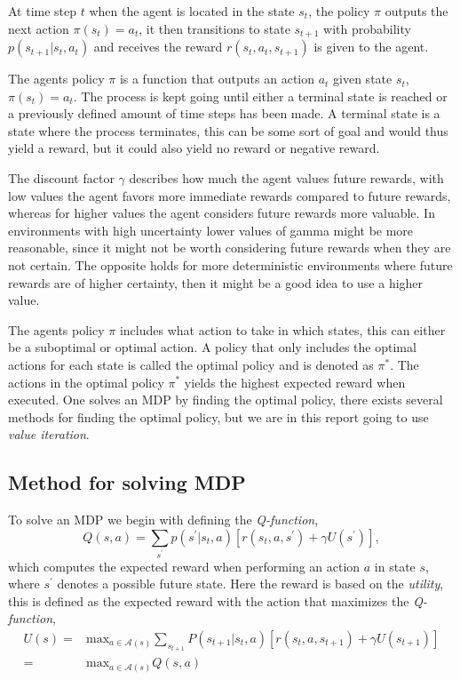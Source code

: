 \documentclass[12pt,A4]{report}
\theoremstyle{definition}
\begin{document}
At time step $t$ when the agent is located in the state $s_t$, the policy $\pi$ outputs the next action $\pi(s_t) = a_t$, it then transitions to state $s_{t+1}$ with probability $p(s_{t+1}|s_t, a_t)$ and receives the reward $r(s_t, a_t, s_{t+1})$ is given to the agent.

The agents policy $\pi$ is a function that outputs an action $a_t$ given state $s_t$, $\pi(s_t) = a_t$. The process is kept going until either a terminal state is reached or a previously defined amount of time steps has been made. A terminal state is a state where the process terminates, this can be some sort of goal and would thus yield a reward, but it could also yield no reward or negative reward.

The discount factor $\gamma$ describes how much the agent values future rewards, with low values the agent favors more immediate rewards compared to future rewards, whereas for higher values the agent considers future rewards more valuable. In environments with high uncertainty lower values of gamma might be more reasonable, since it might not be worth considering future rewards when they are not certain. The opposite holds for more deterministic environments where future rewards are of higher certainty, then it might be a good idea to use a higher value.

The agents policy $\pi$ includes what action to take in which states, this can either be a suboptimal or optimal action. A policy that only includes the optimal actions for each state is called the optimal policy and is denoted as $\pi^*$. The actions in the optimal policy $\pi^*$ yields the highest expected reward when executed. One solves an MDP by finding the optimal policy, there exists several methods for finding the optimal policy, but we are in this report going to use \textit{value iteration}. 

\subsection{Method for solving MDP}
To solve an MDP we begin with defining the \textit{Q-function},
\[ Q(s, a) = \sum_{s^\prime}p(s^\prime|s_t,a)[r(s_t,a,s^\prime) + \gamma U(s^\prime)],\]
which computes the expected reward when performing an action $a$ in state $s$, where $s^\prime$ denotes a possible future state. Here the reward is based on the \textit{utility}, this is defined as the expected reward with the action that maximizes the \textit{Q-function},
\begin{align*}
  U(s) =& \text{max}_{a\in \mathcal{A}(s)} \sum_{s_{t+1}}P(s_{t+1}|s_t,a)[r(s_t,a,s_{t+1}) + \gamma U(s_{t+1})]\\
  = &  \text{max}_{a\in \mathcal{A}(s)} Q(s,a)\\
\end{align*}
\end{document}
